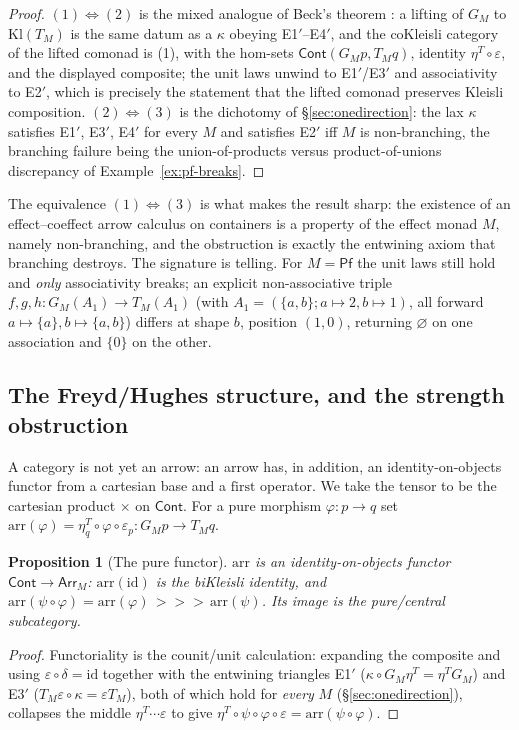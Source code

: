\documentclass[11pt]{amsart}
\theoremstyle{plain}
\newtheorem{proposition}[theorem]{Proposition}
\theoremstyle{definition}
\theoremstyle{remark}
\newcommand{\Cont}{\mathsf{Cont}}
\newcommand{\Kl}{\mathrm{Kl}}
\newcommand{\id}{\mathrm{id}}
\newcommand{\arr}{\mathrm{arr}}
\newcommand{\first}{\mathrm{first}}
\newcommand{\Pf}{\mathsf{Pf}}
\newcommand{\Arr}{\mathsf{Arr}}
\newcommand{\rcomp}{\mathbin{>\!\!>\!\!>}}
\begin{document}
\begin{proof}
$(1)\Leftrightarrow(2)$ is the mixed analogue of Beck's theorem \cite{PowerWatanabe02}: a
lifting of $G_M$ to $\Kl(T_M)$ is the same datum as a $\kappa$ obeying E1$'$--E4$'$, and the
coKleisli category of the lifted comonad is (1), with the hom-sets $\Cont(G_M p,T_M q)$,
identity $\eta^T\circ\varepsilon$, and the displayed composite; the unit laws unwind to
E1$'$/E3$'$ and associativity to E2$'$, which is precisely the statement that the lifted
comonad preserves Kleisli composition. $(2)\Leftrightarrow(3)$ is the dichotomy of
\S\ref{sec:onedirection}: the lax $\kappa$ satisfies E1$'$, E3$'$, E4$'$ for every $M$ and
satisfies E2$'$ iff $M$ is non-branching, the branching failure being the union-of-products
versus product-of-unions discrepancy of Example~\ref{ex:pf-breaks}.
\end{proof}

The equivalence $(1)\Leftrightarrow(3)$ is what makes the result sharp: the existence of an
effect--coeffect arrow calculus on containers is a property of the effect monad $M$, namely
non-branching, and the obstruction is exactly the entwining axiom that branching destroys.
The signature is telling. For $M=\Pf$ the unit laws still hold and \emph{only} associativity
breaks; an explicit non-associative triple $f,g,h\colon G_M(A_1)\to T_M(A_1)$ (with
$A_1=(\{a,b\};a\mapsto2,b\mapsto1)$, all forward $a\mapsto\{a\},b\mapsto\{a,b\}$) differs at
shape $b$, position $(1,0)$, returning $\varnothing$ on one association and $\{0\}$ on the
other.

\subsection{The Freyd/Hughes structure, and the strength obstruction}
A category is not yet an arrow: an arrow has, in addition, an identity-on-objects functor
from a cartesian base and a $\first$ operator. We take the tensor to be the cartesian product
$\times$ on $\Cont$. For a pure morphism $\varphi\colon p\to q$ set
$\arr(\varphi)=\eta^T_q\circ\varphi\circ\varepsilon_p\colon G_M p\to T_M q$.

\begin{proposition}[The pure functor]\label{prop:arr}
$\arr$ is an identity-on-objects functor $\Cont\to\Arr_M$: $\arr(\id)$ is the biKleisli
identity, and $\arr(\psi\circ\varphi)=\arr(\varphi)\,\rcomp\,\arr(\psi)$.
Its image is the pure/central subcategory.
\end{proposition}
\begin{proof}
Functoriality is the counit/unit calculation: expanding the composite and using
$\varepsilon\circ\delta=\id$ together with the entwining triangles E1$'$
($\kappa\circ G_M\eta^T=\eta^T G_M$) and E3$'$ ($T_M\varepsilon\circ\kappa=\varepsilon T_M$),
both of which hold for \emph{every} $M$ (\S\ref{sec:onedirection}), collapses the middle
$\eta^T\cdots\varepsilon$ to give $\eta^T\circ\psi\circ\varphi\circ\varepsilon
=\arr(\psi\circ\varphi)$.
\end{proof}
\end{document}
